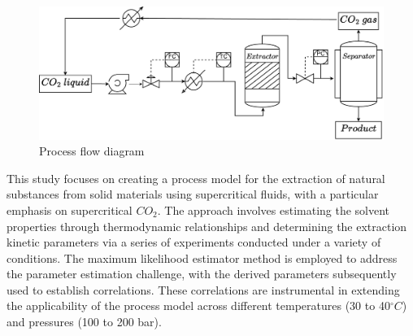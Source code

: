 \documentclass[../Article_Model_Parameters.tex]{subfiles}
\begin{document}
	\begin{figure}[h!]
		\centering
		\includegraphics[width=\columnwidth]{Figures/PFD.drawio.pdf}
		\caption{Process flow diagram}
		\label{fig: SFE_drawing}
	\end{figure}

	
		
	This study focuses on creating a process model for the extraction of natural substances from solid materials using supercritical fluids, with a particular emphasis on supercritical $CO_2$. The approach involves estimating the solvent properties through thermodynamic relationships and determining the extraction kinetic parameters via a series of experiments conducted under a variety of conditions. The maximum likelihood estimator method is employed to address the parameter estimation challenge, with the derived parameters subsequently used to establish correlations. These correlations are instrumental in extending the applicability of the process model across different temperatures (30 to 40$^\circ C$) and pressures (100 to 200 bar).
	
\end{document}
